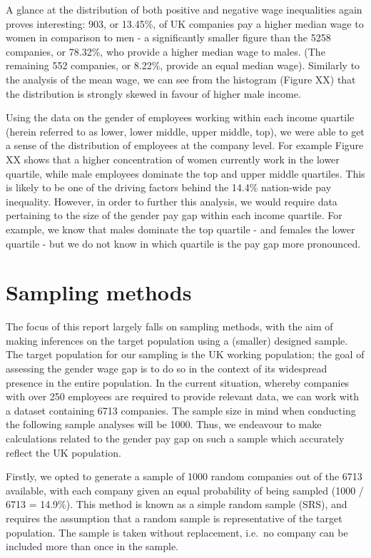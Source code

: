 \documentclass[]{article}
\begin{document}
A glance at the distribution of both positive and negative wage
inequalities again proves interesting: 903, or 13.45\%, of UK companies
pay a higher median wage to women in comparison to men - a significantly
smaller figure than the 5258 companies, or 78.32\%, who provide a higher
median wage to males. (The remaining 552 companies, or 8.22\%, provide
an equal median wage). Similarly to the analysis of the mean wage, we
can see from the histogram (Figure XX) that the distribution is strongly
skewed in favour of higher male income.

Using the data on the gender of employees working within each income
quartile (herein referred to as lower, lower middle, upper middle, top),
we were able to get a sense of the distribution of employees at the
company level. For example Figure XX shows that a higher concentration
of women currently work in the lower quartile, while male employees
dominate the top and upper middle quartiles. This is likely to be one of
the driving factors behind the 14.4\% nation-wide pay inequality.
However, in order to further this analysis, we would require data
pertaining to the size of the gender pay gap within each income
quartile. For example, we know that males dominate the top quartile -
and females the lower quartile - but we do not know in which quartile is
the pay gap more pronounced.

\section{Sampling methods}\label{sampling-methods}

The focus of this report largely falls on sampling methods, with the aim
of making inferences on the target population using a (smaller) designed
sample. The target population for our sampling is the UK working
population; the goal of assessing the gender wage gap is to do so in the
context of its widespread presence in the entire population. In the
current situation, whereby companies with over 250 employees are
required to provide relevant data, we can work with a dataset containing
6713 companies. The sample size in mind when conducting the following
sample analyses will be 1000. Thus, we endeavour to make calculations
related to the gender pay gap on such a sample which accurately reflect
the UK population.

Firstly, we opted to generate a sample of 1000 random companies out of
the 6713 available, with each company given an equal probability of
being sampled (1000 / 6713 = 14.9\%). This method is known as a simple
random sample (SRS), and requires the assumption that a random sample is
representative of the target population. The sample is taken without
replacement, i.e.~no company can be included more than once in the
sample.
\end{document}
